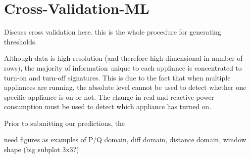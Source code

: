 \documentclass[conference]{IEEEtran}
\begin{document}
%



 


\section{Cross-Validation-ML}
Discuss cross validation here. this is the whole procedure for generating thresholds.

Although data is high resolution (and therefore high dimensional in number of rows), the majority of information unique to each appliance is concentrated to turn-on and turn-off signatures.  This is due to the fact that when multiple appliances are running, the absolute level cannot be used to detect whether one specific appliance is on or not.  The change in real and reactive power consumption must be used to detect which appliance has turned on.  

Prior to submitting our predictions, the 

need figures as examples of P/Q domain, diff domain, distance domain, window shape (big subplot 3x3?)
\end{document}
